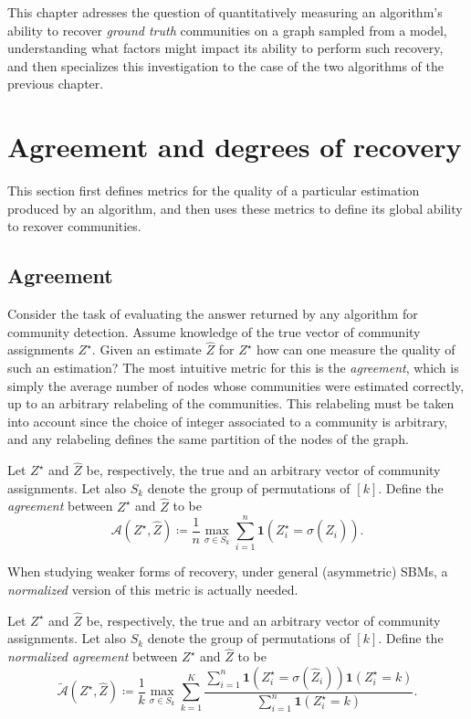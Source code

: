\documentclass[../../main.tex]{subfiles} %
\begin{document}
This chapter adresses the question of quantitatively measuring an algorithm's 
ability to recover \textit{ground truth} communities on a graph sampled from a 
model, understanding what factors might impact its ability to perform such 
recovery, and then specializes this investigation to the case of the two 
algorithms of the previous chapter.

\section{Agreement and degrees of recovery}  %
This section first defines metrics for the quality of a particular estimation 
produced by an algorithm, and then uses these metrics to define its global 
ability to rexover communities.

\subsection{Agreement}
Consider the task of evaluating the answer returned by any algorithm for 
community detection. Assume knowledge of the true vector of community 
assignments \(Z^\star\). Given an estimate \(\hat Z\) for \(Z^\star\) how can 
one measure the quality of such an estimation? The most intuitive metric for 
this is the \textit{agreement}, which is simply the average number of nodes 
whose communities were estimated correctly, up to an arbitrary relabeling of 
the communities. This relabeling must be taken into account since the choice of 
integer associated to a community is arbitrary, and any relabeling defines the 
same partition of the nodes of the graph.
\begin{definition}[Agreement] \label{def:agreement}
	Let \(Z^\star\) and \(\hat Z\) be, respectively, the true and an 
	arbitrary vector of community assignments. Let also \(S_k\) denote the 
	group of permutations of \([k]\). Define the \textit{agreement} between 
	\(Z^\star\) and \(\hat Z\) to be
	\begin{equation} \label{eq:def-agreement}
		\mathcal A(Z^\star, \hat Z) \coloneqq 
		\frac{1}{n} \max_{\sigma \in S_k} 
		\sum_{i=1}^n \mathbf{1}(Z^\star_i = \sigma(\hat Z_i)).
	\end{equation}
\end{definition}

When studying weaker forms of recovery, under general (asymmetric) SBMs, a 
\textit{normalized} version of this metric is actually needed.
\begin{definition} \label{def:normalized-agreement}
	Let \(Z^\star\) and \(\hat Z\) be, respectively, the true and an 
	arbitrary vector of community assignments. Let also \(S_k\) denote the 
	group of permutations of \([k]\). Define the \textit{normalized agreement} 
	between \(Z^\star\) and \(\hat Z\) to be
	\begin{equation} \label{eq:def-normalized-agreement}
		\tilde{\mathcal{A}} (Z^\star, \hat Z) 
		\coloneqq 
		\frac{1}{k} \max_{\sigma \in S_k} 
		\sum_{k=1}^K \frac{\sum_{i=1}^n \mathbf{1}(Z^\star_i = \sigma( 
			\hat Z_i)) \mathbf{1} (Z^\star_i = k)}{\sum_{i=1}^n 
			\mathbf{1} (Z^\star_i = k)}.
	\end{equation}
\end{definition}
\end{document}
